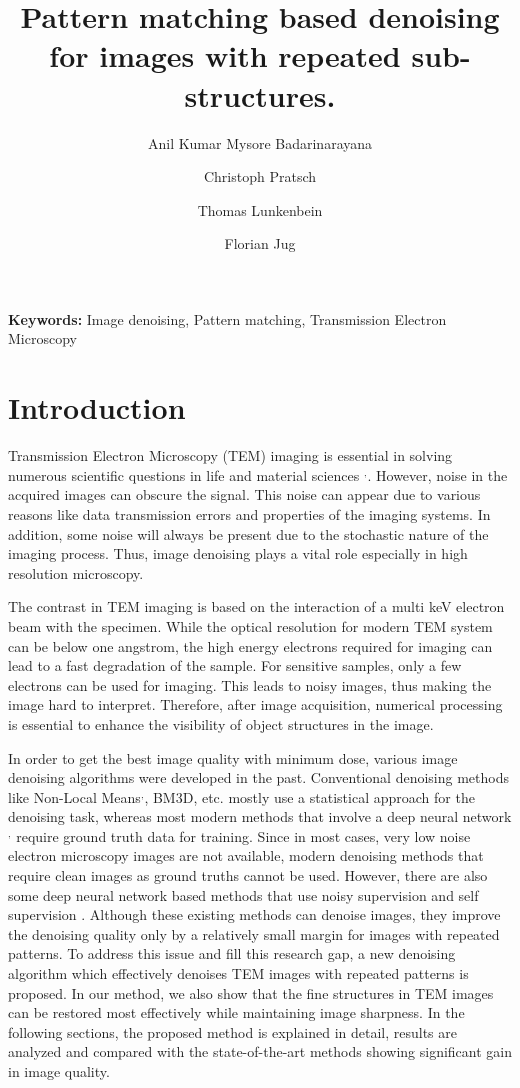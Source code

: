 \documentclass[fleqn,10pt]{wlscirep}
\title{Pattern matching based denoising for images with repeated sub-structures.}
\author[1,*]{Anil Kumar Mysore Badarinarayana}
\author[1]{Christoph Pratsch}
\author[2]{Thomas Lunkenbein}
\author[3]{Florian Jug}
\affil[1]{Hemholtz-Zentrum Berlin, X-ray microscopy, Berlin, 12489, Germany}
\affil[2]{Fritz Haber Institute, Department of Inorganic Chemistry, Berlin, 14195, Germany}
\affil[3]{Fondazione Human Technopole, Computational Biology, Milan, 20157, Italy}
\affil[*]{anil.mysore\_badarinarayana@helmholtz-berlin.de}
\begin{document}
	
	\maketitle
	
	\noindent
	\textbf{Keywords:} Image denoising, Pattern matching, Transmission Electron Microscopy
	
	\section*{Introduction}
	
	Transmission Electron Microscopy (TEM) imaging is essential in solving numerous scientific questions in life and material sciences \cite{CURRY200691}$^{,}$\cite{WANG2008395}. However, noise in the acquired images can obscure the signal. This noise can appear due to various reasons like data transmission errors and properties of the imaging systems. In addition, some noise will always be present due to the stochastic nature of the imaging process. Thus, image denoising plays a vital role especially in high resolution microscopy.
	
	The contrast in TEM imaging is based on the interaction of a multi keV electron beam with the specimen. While the optical resolution for modern TEM system can be below one angstrom,  the high energy electrons required for imaging can lead to a fast degradation of the sample. For sensitive samples, only a few electrons can be used for imaging. This leads to noisy images, thus making the image hard to interpret. Therefore, after image acquisition, numerical processing is essential to enhance the visibility of object structures in the image.
	
	In order to get the best image quality with minimum dose, various image denoising algorithms were developed in the past. Conventional denoising methods like Non-Local Means\cite{bcm_nlm}$^{,}$, BM3D\cite{DBLP:journals/tip/BM3D}, etc. mostly use a statistical approach for the denoising task, whereas most modern methods that involve a deep neural network\cite{zhang2018ffdnet}$^{,}$ \cite{zhang2017beyond} require ground truth data for training. Since in most cases, very low noise electron microscopy images are not available, modern denoising methods that require clean images as ground truths cannot be used. However, there are also some deep neural network based methods that use noisy supervision\cite{DBLP:journals/corr/abs-1803-04189} and self supervision\cite{krull2019noise2void} . Although these existing methods can denoise images, they improve the denoising quality only by a relatively small margin for images with repeated patterns. To address this issue and fill this research gap, a new denoising algorithm which effectively denoises TEM images with repeated patterns is proposed. In  our method, we also show that the fine structures in TEM images can be restored most effectively while maintaining image sharpness. In the following sections, the proposed method is explained in detail, results are analyzed and compared with the state-of-the-art methods showing significant gain in image quality. 
	
\end{document}
